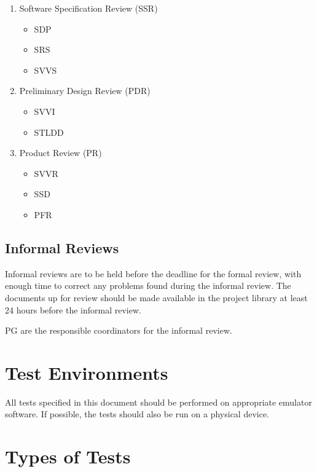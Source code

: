 \documentclass[a4paper]{article}
\begin{document}
\begin{enumerate}

\item Software Specification Review (SSR)
\begin{itemize}
\item SDP
\item SRS
\item SVVS
\end{itemize}


\item Preliminary Design Review (PDR)
\begin{itemize}
\item SVVI
\item STLDD
\end{itemize}


\item Product Review (PR)
\begin{itemize}
\item SVVR
\item SSD
\item PFR
\end{itemize}


\end{enumerate}


\subsection{Informal Reviews}
Informal reviews are to be held before the deadline for the formal review, with enough time to correct any problems found during the informal review. The documents up for review should be made available in the project library at least 24 hours before the informal review.

PG are the responsible coordinators for the informal review.

\section{Test Environments}
All tests specified in this document should be performed on appropriate emulator software. If possible, the tests should also be run on a physical device.

\section{Types of Tests}
\end{document}
